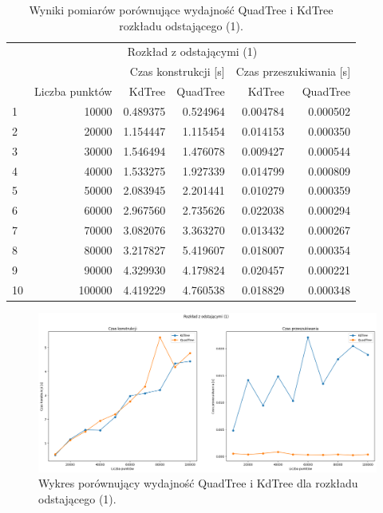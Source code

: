 \documentclass{lab}
\begin{document}
\begin{table}[H]
\centering
\begin{tabular}{lrrrrr}
  \toprule
   & \multicolumn{5}{c}{Rozkład z odstającymi (1)} \\
   &  & \multicolumn{2}{r}{Czas konstrukcji [s]} & \multicolumn{2}{r}{Czas przeszukiwania [s]} \\
   & Liczba punktów & KdTree & QuadTree & KdTree & QuadTree \\
  \midrule
 1 & 10000 & 0.489375 & 0.524964 & 0.004784 & 0.000502 \\
2 & 20000 & 1.154447 & 1.115454 & 0.014153 & 0.000350 \\
3 & 30000 & 1.546494 & 1.476078 & 0.009427 & 0.000544 \\
4 & 40000 & 1.533275 & 1.927339 & 0.014799 & 0.000809 \\
5 & 50000 & 2.083945 & 2.201441 & 0.010279 & 0.000359 \\
6 & 60000 & 2.967560 & 2.735626 & 0.022038 & 0.000294 \\
7 & 70000 & 3.082076 & 3.363270 & 0.013432 & 0.000267 \\
8 & 80000 & 3.217827 & 5.419607 & 0.018007 & 0.000354 \\
9 & 90000 & 4.329930 & 4.179824 & 0.020457 & 0.000221 \\
10 & 100000 & 4.419229 & 4.760538 & 0.018829 & 0.000348 \\
  \bottomrule
  \end{tabular}
\caption{Wyniki pomiarów porównujące wydajność QuadTree i KdTree rozkładu odstającego (1).}
\label{tab:outlier_time_1}
\end{table}

\begin{figure}[H]
  \centering
  \includegraphics[width=1\textwidth]{resources/outlier_graph_1.png}
  \caption{Wykres porównujący wydajność QuadTree i KdTree dla rozkładu odstającego (1).}
  \label{fig:outlier_graph_1}
\end{figure}
\end{document}
